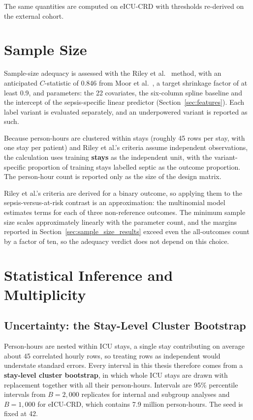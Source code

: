 The same quantities are computed on eICU-CRD with thresholds re-derived on the
external cohort.


\section{Sample Size}
\label{sec:sample_size}

Sample-size adequacy is assessed with the Riley et al.\ \cite{riley2019sample}
method, with an anticipated $C$-statistic of 0.846 from Moor et al.\
\cite{moor2023review}, a target shrinkage factor of at least 0.9, and
\pcNCandidatePredictors{} parameters: the 22 covariates, the six-column spline
baseline and the intercept of the sepsis-specific linear predictor
(Section~\ref{sec:features}). Each label variant is evaluated separately, and
an underpowered variant is reported as such.

Because person-hours are clustered within stays (roughly 45 rows per stay, with
one stay per patient) and Riley et al.'s criteria assume independent
observations, the calculation uses training \textbf{stays} as the independent
unit, with the variant-specific proportion of training stays labelled septic as
the outcome proportion. The person-hour count is reported only as the size of
the design matrix.

Riley et al.'s criteria are derived for a binary outcome, so applying them to
the sepsis-versus-at-risk contrast is an approximation: the multinomial model
estimates \pcNCandidatePredictors{} terms for each of three non-reference
outcomes. The minimum sample size scales approximately linearly with the
parameter count, and the margins reported in
Section~\ref{sec:sample_size_results} exceed even the all-outcomes count by a
factor of ten, so the adequacy verdict does not depend on this choice.


\section{Statistical Inference and Multiplicity}
\label{sec:multiplicity}
\label{sec:inference}

\subsection{Uncertainty: the Stay-Level Cluster Bootstrap}

Person-hours are nested within ICU stays, a single stay contributing on average
about 45 correlated hourly rows, so treating rows as independent would
understate standard errors. Every interval in this thesis therefore comes from
a \textbf{stay-level cluster bootstrap}, in which whole ICU stays are drawn with
replacement together with all their person-hours. Intervals are 95\%
percentile intervals from $B = 2{,}000$ replicates for internal and subgroup
analyses and $B = 1{,}000$ for eICU-CRD, which contains 7.9 million
person-hours. The seed is fixed at 42.

